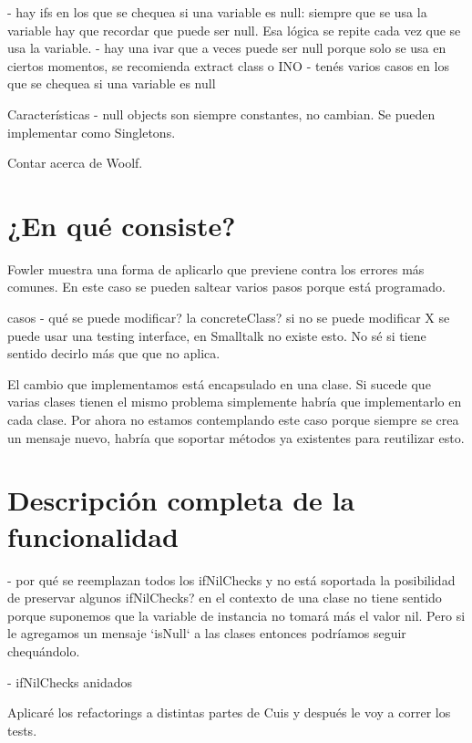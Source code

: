 - hay ifs en los que se chequea si una variable es null: siempre que se usa la variable hay que recordar
que puede ser null. Esa lógica se repite cada vez que se usa la variable.
- hay una ivar que a veces puede ser null porque solo se usa en ciertos momentos, se recomienda
extract class o INO
- tenés varios casos en los que se chequea si una variable es null

Características
- null objects son siempre constantes, no cambian. Se pueden implementar como Singletons.


Contar acerca de Woolf.

\section{¿En qué consiste?}

Fowler muestra una forma de aplicarlo que previene contra los errores más comunes. En este caso se pueden
saltear varios pasos porque está programado.

casos
- qué se puede modificar? la concreteClass? 
si no se puede modificar X se puede usar una testing interface, en Smalltalk no existe esto. No sé
si tiene sentido decirlo más que que no aplica.



El cambio que implementamos está encapsulado en una clase. Si sucede que varias clases tienen el mismo
problema simplemente habría que implementarlo en cada clase. Por ahora no estamos contemplando este caso
porque siempre se crea un mensaje nuevo, habría que soportar métodos ya existentes para reutilizar esto.



\section{Descripción completa de la funcionalidad}











- por qué se reemplazan todos los ifNilChecks y no está soportada la posibilidad de preservar algunos ifNilChecks? 
en el contexto de una clase no tiene sentido porque suponemos que la variable de instancia no
tomará más el valor nil. Pero si le agregamos un mensaje `isNull` a las clases entonces
podríamos seguir chequándolo. 

- ifNilChecks anidados

Aplicaré los refactorings a distintas partes de Cuis y después le voy a correr los tests.